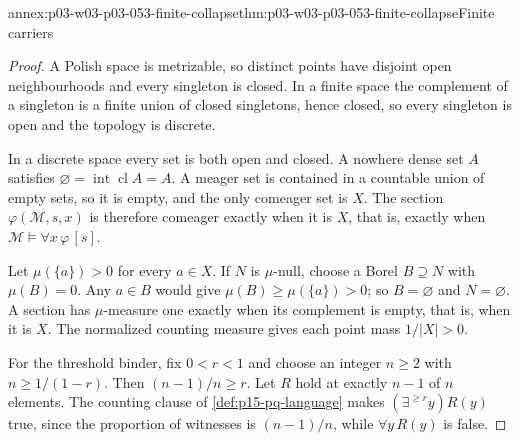 \begin{annexitem}{annex:p03-w03-p03-053-finite-collapse}{thm:p03-w03-p03-053-finite-collapse}{Finite carriers}
\begin{proof}
A Polish space is metrizable, so distinct points have disjoint open
neighbourhoods and every singleton is closed. In a finite space the
complement of a singleton is a finite union of closed singletons, hence
closed, so every singleton is open and the topology is discrete.

In a discrete space every set is both open and closed. A nowhere dense
set \(A\) satisfies \(\varnothing=\operatorname{int}\operatorname{cl}A=A\).
A meager set is contained in a countable union of empty sets, so it is
empty, and the only comeager set is \(X\). The section
\(\varphi(\mathcal M,s,x)\) is therefore comeager exactly when it is
\(X\), that is, exactly when \(\mathcal M\models\forall x\,\varphi\,[s]\).

Let \(\mu(\{a\})>0\) for every \(a\in X\). If \(N\) is \(\mu\)-null, choose
a Borel \(B\supseteq N\) with \(\mu(B)=0\). Any \(a\in B\) would give
\(\mu(B)\ge\mu(\{a\})>0\); so \(B=\varnothing\) and \(N=\varnothing\).
A section has \(\mu\)-measure one exactly when its complement is empty,
that is, when it is \(X\). The normalized counting measure gives each
point mass \(1/|X|>0\).

For the threshold binder, fix \(0<r<1\) and choose an integer
\(n\ge2\) with \(n\ge1/(1-r)\). Then \((n-1)/n\ge r\). Let \(R\) hold
at exactly \(n-1\) of \(n\) elements. The counting clause of
\cref{def:p15-pq-language} makes \((\exists^{\ge r}y)R(y)\) true, since
the proportion of witnesses is \((n-1)/n\), while \(\forall y\,R(y)\) is
false.
\end{proof}
\end{annexitem}

